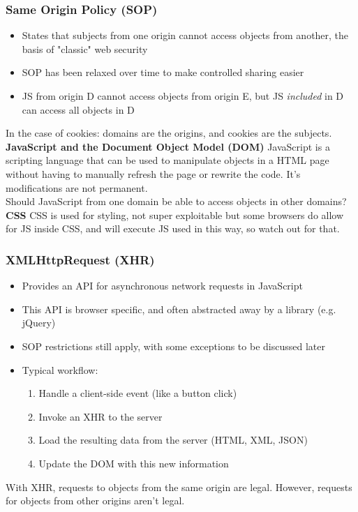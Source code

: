 \documentclass{article}
\begin{document}
\subsubsection{Same Origin Policy (SOP)}
\begin{itemize}
    \item States that subjects from one origin cannot access objects from another, the basis of "classic" web security
    \item SOP has been relaxed over time to make controlled sharing easier
    \item JS from origin D cannot access objects from origin E, but JS \textit{included} in D can access all objects in D
\end{itemize}
In the case of cookies: domains are the origins, and cookies are the subjects.
\textbf{JavaScript and the Document Object Model (DOM)}
JavaScript is a scripting language that can be used to manipulate objects in a HTML page without having to manually refresh the page or rewrite the code. It's modifications are not permanent.
\\Should JavaScript from one domain be able to access objects in other domains?
\textbf{CSS}
CSS is used for styling, not super exploitable but some browsers do allow for JS inside CSS, and will execute JS used in this way, so watch out for that.
\subsubsection{XMLHttpRequest (XHR)}
\begin{itemize}
    \item Provides an API for asynchronous network requests in JavaScript
    \item This API is browser specific, and often abstracted away by a library (e.g. jQuery)
    \item SOP restrictions still apply, with some exceptions to be discussed later
    \item Typical workflow:
        \begin{enumerate}
            \item Handle a client-side event (like a button click)
            \item Invoke an XHR to the server
            \item Load the resulting data from the server (HTML, XML, JSON)
            \item Update the DOM with this new information
        \end{enumerate}
\end{itemize}
With XHR, requests to objects from the same origin are legal. However, requests for objects from other origins aren't legal.
\end{document}
